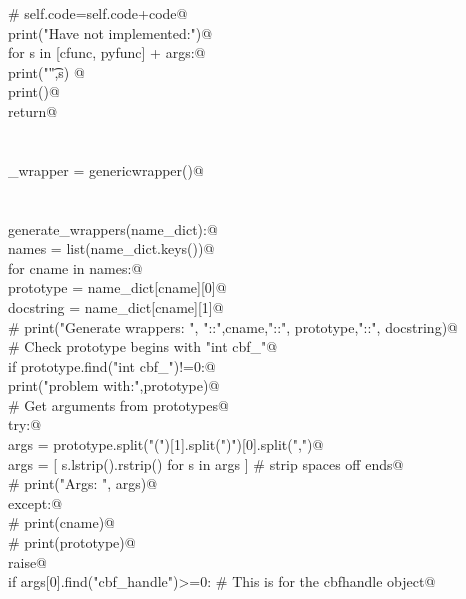 \documentclass[10pt,a4paper,twoside,notitlepage]{article}
\begin{document}
\begin{flushleft}
\begin{minipage}{\linewidth}
\begin{list}{}{}
\mbox{}\verb@#       self.code=self.code+code@\\
\mbox{}\verb@       print("Have not implemented:")@\\
\mbox{}\verb@       for s in [cfunc, pyfunc] + args:@\\
\mbox{}\verb@           print("\t",s) @\\
\mbox{}\verb@       print()@\\
\mbox{}\verb@       return@\\
\mbox{}\verb@@\\
\mbox{}\verb@@\\
\mbox{}\verb@generic_wrapper = genericwrapper()@\\
\mbox{}\verb@@\\
\mbox{}\verb@@\\
\mbox{}\verb@def generate_wrappers(name_dict):@\\
\mbox{}\verb@   names = list(name_dict.keys())@\\
\mbox{}\verb@   for cname in names:@\\
\mbox{}\verb@      prototype = name_dict[cname][0]@\\
\mbox{}\verb@      docstring = name_dict[cname][1]@\\
\mbox{}\verb@      # print("Generate wrappers: ", "::",cname,"::", prototype,"::", docstring)@\\
\mbox{}\verb@      # Check prototype begins with "int cbf_"@\\
\mbox{}\verb@      if prototype.find("int cbf_")!=0:@\\
\mbox{}\verb@         print("problem with:",prototype)@\\
\mbox{}\verb@      # Get arguments from prototypes@\\
\mbox{}\verb@      try:@\\
\mbox{}\verb@         args = prototype.split("(")[1].split(")")[0].split(",")@\\
\mbox{}\verb@         args = [ s.lstrip().rstrip() for s in args ] # strip spaces off ends@\\
\mbox{}\verb@         # print("Args: ", args)@\\
\mbox{}\verb@      except:@\\
\mbox{}\verb@         # print(cname)@\\
\mbox{}\verb@         # print(prototype)@\\
\mbox{}\verb@         raise@\\
\mbox{}\verb@      if args[0].find("cbf_handle")>=0: # This is for the cbfhandle object@\\

\end{list}
\end{minipage}
\end{flushleft}
\end{document}
